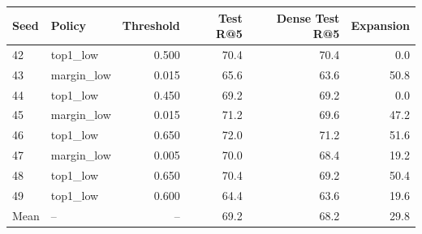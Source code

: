 \begin{tabular}{llrrrr}
\toprule
Seed & Policy & Threshold & Test R@5 & Dense Test R@5 & Expansion \\
\midrule
42 & top1\_low & 0.500 & 70.4 & 70.4 & 0.0 \\
43 & margin\_low & 0.015 & 65.6 & 63.6 & 50.8 \\
44 & top1\_low & 0.450 & 69.2 & 69.2 & 0.0 \\
45 & margin\_low & 0.015 & 71.2 & 69.6 & 47.2 \\
46 & top1\_low & 0.650 & 72.0 & 71.2 & 51.6 \\
47 & margin\_low & 0.005 & 70.0 & 68.4 & 19.2 \\
48 & top1\_low & 0.650 & 70.4 & 69.2 & 50.4 \\
49 & top1\_low & 0.600 & 64.4 & 63.6 & 19.6 \\
\midrule
Mean & -- & -- & 69.2 & 68.2 & 29.8 \\
\bottomrule
\end{tabular}
